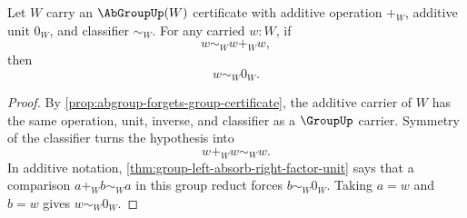 \begin{lemma}
\label{lem:abgroup-additive-duplicate-cancellation}
Let $W$ carry an $\AbGroupUp(W)$ certificate with additive operation $+_W$, additive unit $0_W$, and classifier $\sim_W$. For any carried $w:W$, if
$$
w\sim_W w+_W w,
$$
then
$$
w\sim_W 0_W.
$$
\end{lemma}
\begin{proof}
By \autoref{prop:abgroup-forgets-group-certificate}, the additive carrier of $W$ has the same operation, unit, inverse, and classifier as a $\GroupUp$ carrier. Symmetry of the classifier turns the hypothesis into
$$
w+_W w\sim_W w.
$$
In additive notation, \autoref{thm:group-left-absorb-right-factor-unit} says that a comparison $a+_W b\sim_W a$ in this group reduct forces $b\sim_W0_W$. Taking $a=w$ and $b=w$ gives $w\sim_W0_W$.
\end{proof}

